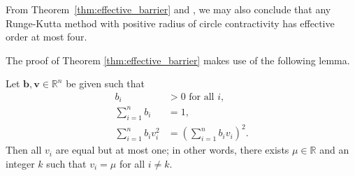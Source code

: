 \begin{remark}
	From Theorem~\ref{thm:effective_barrier} and \cite[Theorem~4.1]{dahlquist2006}, 
  	we may also conclude that any Runge-Kutta method with positive radius of 
  	circle contractivity has effective order at most four.
\end{remark}

The proof of Theorem \ref{thm:effective_barrier} makes use of the following 
lemma.
\begin{lemma}\label{Davids_lemma}
	Let $\bm{b},\bm{v} \in \mathbb{R}^{n}$ be given such that
    \begin{subequations}\label{eq:DavidsLemma}
    		\begin{align}
    			b_i & > 0 \mbox{ for all } i, \label{eq:DavidsLemma_a} \\
    			\sum_{i=1}^n b_i & = 1, \label{eq:DavidsLemma_b} \\
    			\sum_{i=1}^n b_i v_i^2 & = \left(\sum_{i=1}^n b_i v_i \right)^2. \label{eq:DavidsLemma_c}
    		\end{align}
    	\end{subequations}
    	Then all $v_i$ are equal but at most one; in other words, there exists 
    	$\mu \in \mathbb{R}$ and an integer $k$ such that $v_i = \mu$ for 
    	all $i \ne k$.
\end{lemma}

